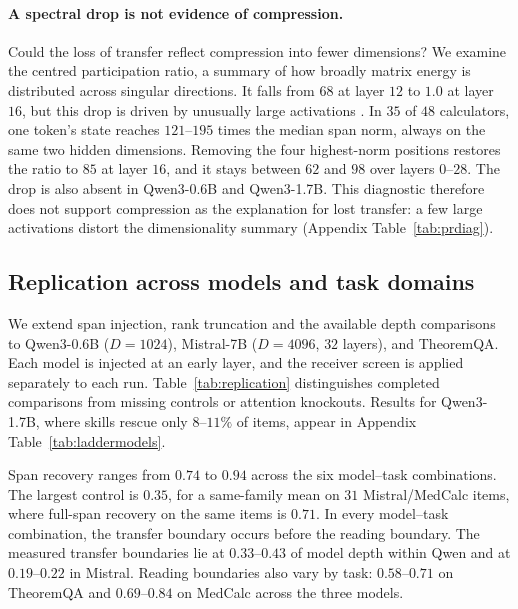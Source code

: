 \documentclass{article}
\begin{document}
\paragraph{A spectral drop is not evidence of compression.}
Could the loss of transfer reflect compression into fewer dimensions? We
examine the centred participation ratio, a summary of how broadly matrix energy
is distributed across singular directions. It falls from $68$ at layer $12$
to $1.0$ at layer $16$, but this drop is driven by unusually large activations
\citep{sun2024massive, shi2026melayer}. In $35$ of $48$ calculators, one
token's state reaches $121$--$195$ times the median span norm, always on the
same two hidden dimensions. Removing the four highest-norm positions restores
the ratio to $85$ at layer $16$, and it stays between $62$ and $98$ over layers
$0$--$28$. The drop is also absent in Qwen3-0.6B and Qwen3-1.7B.
This diagnostic therefore does not support compression as the explanation
for lost transfer: a few large activations distort the dimensionality summary
(Appendix Table~\ref{tab:prdiag}).

\subsection{Replication across models and task domains}
\label{sec:ladder}

We extend span injection, rank truncation and the available depth comparisons
to Qwen3-0.6B ($D=1024$), Mistral-7B ($D=4096$, $32$ layers), and TheoremQA.
Each model is injected at an early layer, and the receiver screen is applied
separately to each run. Table~\ref{tab:replication} distinguishes completed
comparisons from missing controls or attention knockouts. Results for
Qwen3-1.7B, where skills rescue only $8$--$11\%$ of items, appear in Appendix
Table~\ref{tab:laddermodels}.

Span recovery ranges from $0.74$ to $0.94$ across the six model--task
combinations. The largest control is $0.35$, for a same-family
mean on $31$ Mistral/MedCalc items, where full-span recovery on the same items
is $0.71$. In every model--task combination, the transfer boundary occurs
before the reading boundary. The measured transfer boundaries lie at
$0.33$--$0.43$ of model depth within Qwen and at $0.19$--$0.22$ in Mistral.
Reading boundaries also vary by task: $0.58$--$0.71$ on TheoremQA and
$0.69$--$0.84$ on MedCalc across the three models.
\end{document}
